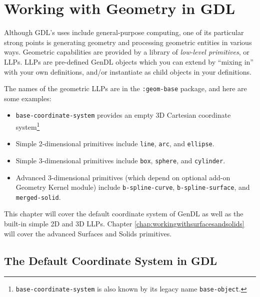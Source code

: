 \documentclass [11pt]{book}
\begin{document}
\chapter{Working with Geometry in GDL}

\label{chap:workingwithgeometryingdl}



Although GDL's uses include general-purpose computing, one of
  its particular strong points is generating geometry and processing
  geometric entities in various ways. Geometric capabilities are
  provided by a library of \emph{low-level primitives}, or LLPs. LLPs are pre-defined GenDL objects which you can
	extend by ``mixing in'' with your own definitions, and/or
	instantiate as child objects in your definitions.



The names of the geometric LLPs are in the \texttt{:geom-base} package, and here are some examples:

\begin{itemize}

\item \texttt{base-coordinate-system} provides an empty 3D Cartesian coordinate system\footnote{\texttt{base-coordinate-system} is also known by its legacy name \texttt{base-object}.}

\item Simple 2-dimensional primitives include \texttt{line}, \texttt{arc}, and \texttt{ellipse}.

\item Simple 3-dimensional primitives include \texttt{box}, \texttt{sphere}, and \texttt{cylinder}.

\item Advanced 3-dimensional primitives (which depend on optional add-on Geometry Kernel module) include \texttt{b-spline-curve}, \texttt{b-spline-surface}, and \texttt{merged-solid}.

\end{itemize}

This chapter will cover the default coordinate system of GenDL as well as the built-in simple 2D and 3D LLPs. Chapter 
\ref{chap:workingwithsurfacesandsolids} will cover the advanced Surfaces and Solids primitives.



\section{The Default Coordinate System in GDL}
\end{document}
